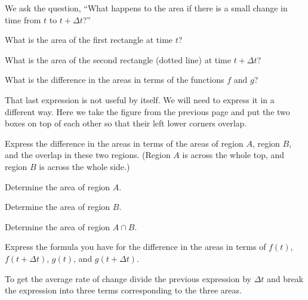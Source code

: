 \begin{problem}
  We ask the question, ``What happens to the area if there is a small
  change in time from $t$ to $t+\Delta t$?''

  \scalebox{0.55}{}

  \begin{subproblem}
  \item What is the area of the first rectangle at time $t$?
    \vfill
  \item What is the area of the second rectangle (dotted line) at time $t+\Delta t$?
    \vfill
  \item What is the difference in the areas in terms of the functions
    $f$ and $g$?
    \vfill
  \end{subproblem}

  \clearpage

\item That last expression is not useful by itself. We will need to
  express it in a different way. Here we take the figure from the
  previous page and put the two boxes on top of each other so that
  their left lower corners overlap.

  \scalebox{0.55}{}

  \begin{subproblem}
    \item Express the difference in the areas in terms of the areas of
      region $A$, region $B$, and the overlap in these two
      regions. (Region $A$ is across the whole top, and region $B$ is
      across the whole side.)
      \vfill

    \item Determine the area of region $A$.
      \vfill

    \item Determine the area of region $B$.
      \vfill

    \item Determine the area of region $A\cap B$.
      \vfill

    \clearpage

    \item Express the formula you have for the difference in the areas
      in terms of $f(t)$, $f(t+\Delta t)$, $g(t)$, and $g(t+\Delta t)$.
      \vfill

    \item To get the average rate of change divide the previous
      expression by $\Delta t$ and break the expression into three
      terms corresponding to the three areas.


\end{subproblem}
\end{problem}
